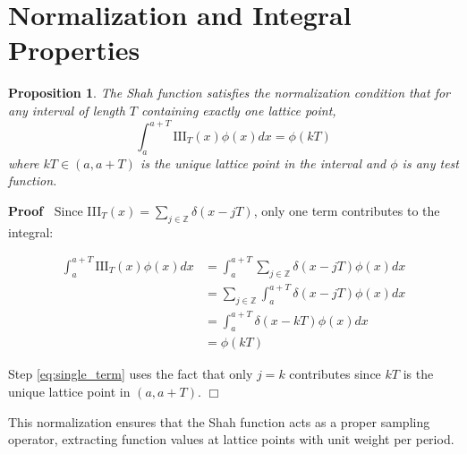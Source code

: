 \documentclass{article}
\newenvironment{proof}{\noindent\textbf{Proof\ }}{\hspace*{\fill}$\Box$\medskip}
\newtheorem{proposition}{Proposition}
\begin{document}
\section{Normalization and Integral Properties}

\begin{proposition}
  \label{prop:shah_normalization}The Shah function satisfies the normalization
  condition that for any interval of length $T$ containing exactly one lattice
  point,
  \begin{equation}
    \label{eq:shah_integral} \int_a^{a + T} \text{III}_T (x) \phi (x) dx =
    \phi (kT)
  \end{equation}
  where $kT \in (a, a + T)$ is the unique lattice point in the interval and
  $\phi$ is any test function.
\end{proposition}

\begin{proof}
  Since III$_T (x) = \sum_{j \in \mathbb{Z}} \delta (x - jT)$, only one term
  contributes to the integral:
  
  \begin{align}
    \int_a^{a + T} \text{III}_T (x) \phi (x) dx & = \int_a^{a + T} \sum_{j \in
    \mathbb{Z}} \delta (x - jT) \phi (x) dx  \label{eq:expand_integral}\\
    & = \sum_{j \in \mathbb{Z}} \int_a^{a + T} \delta (x - jT) \phi (x) dx 
    \label{eq:interchange_sum_integral_norm}\\
    & = \int_a^{a + T} \delta (x - kT) \phi (x) dx  \label{eq:single_term}\\
    & = \phi (kT)  \label{eq:sifting_normalization}
  \end{align}
  
  Step \eqref{eq:single_term} uses the fact that only $j = k$ contributes
  since $kT$ is the unique lattice point in $(a, a + T)$.
\end{proof}

This normalization ensures that the Shah function acts as a proper sampling
operator, extracting function values at lattice points with unit weight per
period.

{\cite{grafakosClassicalFourierAnalysis}}{\cite{hormanderI}}{\cite{rudinRealComplexAnalysis}}{\cite{katznelsonHarmonicAnalysis}}{\cite{steinWeissEuclidean}}{\cite{evansPDE}}{\cite{courantHilbertII}}{\cite{follandFourierApplications}}{\cite{ahlforsComplexAnalysis}}{\cite{mumfordTataI}}
\end{document}
